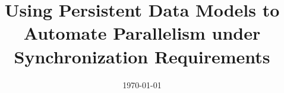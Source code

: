 \documentclass[a4paper, 11pt, oneside]{Thesis}  %
\begin{document}
\frontmatter      %

\title  {Using Persistent Data Models to Automate Parallelism under Synchronization Requirements}
\addresses  {\groupname\\\deptname\\\univname}
\date       {\today}
\subject    {}
\keywords   {}

\maketitle


\fancyhead{}        %
\rhead{\thepage}    %
\lhead{}            %

\pagestyle{fancy}   %
\end{document}
